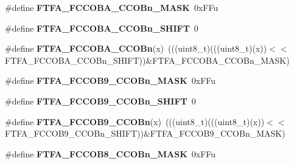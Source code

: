 \begin{DoxyCompactItemize}
\item 
\mbox{\label{group___f_t_f_a___register___masks_gaa0a0a7f61d12d4ec0fd9ee2c9117cd03}} 
\#define {\bfseries F\+T\+F\+A\+\_\+\+F\+C\+C\+O\+B\+A\+\_\+\+C\+C\+O\+Bn\+\_\+\+M\+A\+SK}~0x\+F\+Fu
\item 
\mbox{\label{group___f_t_f_a___register___masks_ga7ed8fee49581acc92a76f451786a6723}} 
\#define {\bfseries F\+T\+F\+A\+\_\+\+F\+C\+C\+O\+B\+A\+\_\+\+C\+C\+O\+Bn\+\_\+\+S\+H\+I\+FT}~0
\item 
\mbox{\label{group___f_t_f_a___register___masks_gab15606625d07da7c18f59be622adf32a}} 
\#define {\bfseries F\+T\+F\+A\+\_\+\+F\+C\+C\+O\+B\+A\+\_\+\+C\+C\+O\+Bn}(x)~(((uint8\+\_\+t)(((uint8\+\_\+t)(x))$<$$<$F\+T\+F\+A\+\_\+\+F\+C\+C\+O\+B\+A\+\_\+\+C\+C\+O\+Bn\+\_\+\+S\+H\+I\+FT))\&F\+T\+F\+A\+\_\+\+F\+C\+C\+O\+B\+A\+\_\+\+C\+C\+O\+Bn\+\_\+\+M\+A\+SK)
\item 
\mbox{\label{group___f_t_f_a___register___masks_ga3d424ebf51a8b74312c01efe408117f1}} 
\#define {\bfseries F\+T\+F\+A\+\_\+\+F\+C\+C\+O\+B9\+\_\+\+C\+C\+O\+Bn\+\_\+\+M\+A\+SK}~0x\+F\+Fu
\item 
\mbox{\label{group___f_t_f_a___register___masks_gae44c6a3215eb5b3a75a5cdd54e570127}} 
\#define {\bfseries F\+T\+F\+A\+\_\+\+F\+C\+C\+O\+B9\+\_\+\+C\+C\+O\+Bn\+\_\+\+S\+H\+I\+FT}~0
\item 
\mbox{\label{group___f_t_f_a___register___masks_ga08fe939d39815b4825664858c66e32ff}} 
\#define {\bfseries F\+T\+F\+A\+\_\+\+F\+C\+C\+O\+B9\+\_\+\+C\+C\+O\+Bn}(x)~(((uint8\+\_\+t)(((uint8\+\_\+t)(x))$<$$<$F\+T\+F\+A\+\_\+\+F\+C\+C\+O\+B9\+\_\+\+C\+C\+O\+Bn\+\_\+\+S\+H\+I\+FT))\&F\+T\+F\+A\+\_\+\+F\+C\+C\+O\+B9\+\_\+\+C\+C\+O\+Bn\+\_\+\+M\+A\+SK)
\item 
\mbox{\label{group___f_t_f_a___register___masks_ga4c40268e4d4ae3bc87a782cbbfc9ec99}} 
\#define {\bfseries F\+T\+F\+A\+\_\+\+F\+C\+C\+O\+B8\+\_\+\+C\+C\+O\+Bn\+\_\+\+M\+A\+SK}~0x\+F\+Fu
\item 
\mbox{\label{group___f_t_f_a___register___masks_ga9603935c5e6f2c1d51b6b4e952e1428a}} 

\end{DoxyCompactItemize}

